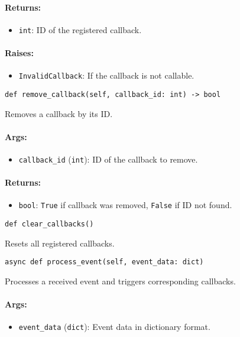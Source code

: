 \documentclass{article}
\begin{document}
\paragraph{Returns:}
\begin{itemize}
    \item \texttt{int}: ID of the registered callback.
\end{itemize}

\paragraph{Raises:}
\begin{itemize}
    \item \texttt{InvalidCallback}: If the callback is not callable.
\end{itemize}

\noindent\texttt{def remove\_callback(self, callback\_id: int) -> bool}

\noindent Removes a callback by its ID.

\paragraph{Args:}
\begin{itemize}
    \item \texttt{callback\_id} (\texttt{int}): ID of the callback to remove.
\end{itemize}

\paragraph{Returns:}
\begin{itemize}
    \item \texttt{bool}: \texttt{True} if callback was removed, \texttt{False} if ID not found.
\end{itemize}

\noindent\texttt{def clear\_callbacks()}

\noindent Resets all registered callbacks.

\noindent\texttt{async def process\_event(self, event\_data: dict)}

\noindent Processes a received event and triggers corresponding callbacks.

\paragraph{Args:}
\begin{itemize}
    \item \texttt{event\_data} (\texttt{dict}): Event data in dictionary format.
\end{itemize}
\end{document}
